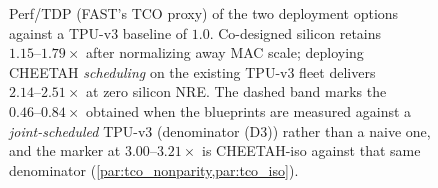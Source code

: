 \begin{figure}[t]
\centering
\caption{Perf/TDP (FAST's TCO proxy) of the two deployment options against a
TPU-v3 baseline of $1.0$. Co-designed silicon retains $1.15\text{--}1.79\times$
after normalizing away MAC scale; deploying CHEETAH \emph{scheduling} on the
existing TPU-v3 fleet delivers $2.14\text{--}2.51\times$ at zero silicon NRE. The
dashed band marks the $0.46\text{--}0.84\times$ obtained when the blueprints are
measured against a \emph{joint-scheduled} TPU-v3 (denominator (D3)) rather than a
naive one, and the marker at $3.00\text{--}3.21\times$ is CHEETAH-iso against
that same denominator (\cref{par:tco_nonparity,par:tco_iso}).}
\label{fig:tco_perftdp}
\end{figure}

